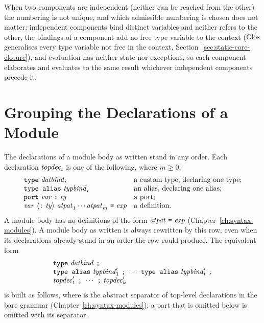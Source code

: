 When two components are independent (neither can be reached from the other)
the numbering is not unique, and which admissible numbering is chosen does not
matter: independent components bind distinct variables and neither refers to
the other, the bindings of a component add no free type variable to the
context ($\mathrm{Clos}$ generalises every type variable not free in the context,
Section~\ref{sec:static-core-closure}), and evaluation has neither state nor
exceptions, so each component elaborates and evaluates to the same result
whichever independent components precede it. %

\section{Grouping the Declarations of a Module}
\label{sec:appendix-derived-forms-modules}

The declarations of a module body as written stand in any order. Each
declaration $\mathit{topdec}_i$ is one of the following, where $m\geq 0$:
\[
  \begin{array}{ll}
    \textnormal{\texttt{type}}\ \mathit{datbind}_i & \text{a custom type, declaring one type;}\\
    \textnormal{\texttt{type alias}}\ \mathit{typbind}_i & \text{an alias, declaring one alias;}\\
    \textnormal{\texttt{port}}\ \mathit{var}\ \textnormal{\texttt{:}}\ \mathit{ty} & \text{a port;}\\
    \mathit{var}\ \langle \textnormal{\texttt{:}}\ \mathit{ty}\rangle\ \mathit{atpat}_1\cdots\mathit{atpat}_m\ \textnormal{\texttt{=}}\ \mathit{exp}
      & \text{a definition.}
  \end{array}
\] A module body has no definitions of the form
$\mathit{atpat}\ \textnormal{\texttt{=}}\ \mathit{exp}$ (Chapter~\ref{ch:syntax-modules}). A module body as
written is always rewritten by this row, even when its declarations already
stand in an order the row could produce. The equivalent form
\[
  \begin{array}{l}
    \textnormal{\texttt{type}}\ \mathit{datbind}\ \textnormal{\texttt{;}}\\
    \textnormal{\texttt{type alias}}\ \mathit{typbind}'_1\ \textnormal{\texttt{;}}\ \cdots\
      \textnormal{\texttt{type alias}}\ \mathit{typbind}'_l\ \textnormal{\texttt{;}}\\
    \mathit{topdec}'_1\ \textnormal{\texttt{;}}\ \cdots\ \textnormal{\texttt{;}}\ \mathit{topdec}'_k
  \end{array}
\]
is built as follows, where \kw{;} is the abstract separator of top-level
declarations in the bare grammar (Chapter~\ref{ch:syntax-modules}); a part
that is omitted below is omitted with its separator.

